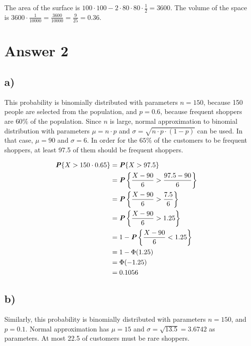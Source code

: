 \documentclass[12pt]{article}
\newcommand{\boldP}{\textbf{\textit{P}}}
\begin{document}
\noindent
The area of the surface is $100 \cdot 100 - 2 \cdot 80 \cdot 80 \cdot
\frac{1}{2} = 3600$. The volume of the space is $3600 \cdot \frac{1}{10000} =
\frac{3600}{10000} = \frac{9}{25} = 0.36$.

\newpage

\section*{Answer 2}

\subsection*{a)}

This probability is binomially distributed with parameters $n = 150$, because
150 people are selected from the population, and $p = 0.6$, because frequent
shoppers are $60\%$ of the population. Since $n$ is large, normal approximation
to binomial distribution with parameters $\mu = n \cdot p$ and $\sigma = \sqrt{n
\cdot p \cdot (1 - p)}$ can be used. In that case, $\mu = 90$ and $\sigma = 6$.
In order for the $65\%$ of the customers to be frequent shoppers, at least 97.5
of them should be frequent shoppers.

\vspace{-5mm}
\begin{align*}
  \boldP\{X > 150 \cdot 0.65\}
    &= \boldP\{X > 97.5\} \\
    &= \boldP \left\{ \frac{X - 90}{6} > \frac{97.5 - 90}{6} \right\} \\
    &= \boldP \left\{ \frac{X - 90}{6} > \frac{7.5}{6} \right\} \\
    &= \boldP \left\{ \frac{X - 90}{6} > 1.25 \right\} \\
    &= 1 - \boldP \left\{ \frac{X - 90}{6} < 1.25 \right\} \\
    &= 1 - \Phi(1.25) \\
    &= \Phi(-1.25) \\
    &= 0.1056
\end{align*}

\subsection*{b)}

Similarly, this probability is binomially distributed with parameters $n = 150$,
and $p = 0.1$. Normal approximation has $\mu = 15$ and $\sigma = \sqrt{13.5} =
3.6742$ as parameters. At most 22.5 of customers must be rare shoppers.
\end{document}
